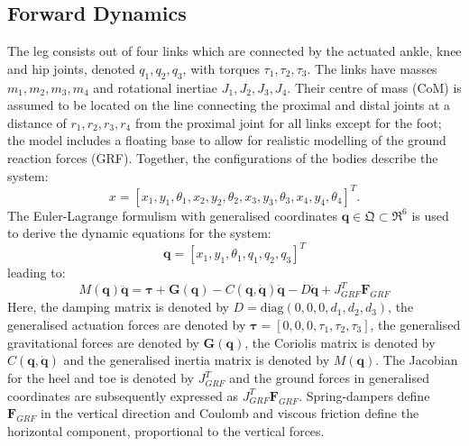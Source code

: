 \documentclass[letterpaper, 10 pt, conference]{ieeeconf}  %
\begin{document}
	\subsection{Forward Dynamics} 
	The leg consists out of four links which are connected by the actuated ankle, knee and hip joints, denoted $q_1,q_2,q_3$, with torques $\tau_1,\tau_2,\tau_3$. %
	The links have masses $m_1,m_2,m_3,m_4$ and rotational inertiae $J_1,J_2,J_3,J_4$. Their centre of mass (CoM) is assumed to be located on the line connecting the proximal and distal joints at a distance of $r_1,r_2,r_3,r_4$ from the proximal joint for all links except for the foot; the model includes a floating base to allow for realistic modelling of the ground reaction forces (GRF). Together, the configurations of the bodies describe the system:
	\begin{equation}
	x = [x_1,y_1,\theta_1,x_2,y_2,\theta_2, x_3,y_3,\theta_3,x_4,y_4,\theta_4]^T. 
	\end{equation}
	The Euler-Lagrange formulism with generalised coordinates $\mathbf{q} \in \mathfrak{Q} \subset \mathfrak{R}^{6}$ is used to derive the dynamic equations for the system:
	\begin{equation}
	\mathbf{q}=[x_1,y_1,\theta_1,q_1,q_2,q_3]^T \label{eq:q}
	\end{equation}
	leading to:
	\begin{equation}
	M(\mathbf{q})\mathbf{\ddot q} = \mathbf{\boldsymbol{\tau} + G(q)} - C\mathbf{(q,\dot q)\dot q -} D \mathbf{\dot q} + J_{GRF}^T \mathbf{F}_{GRF}
	\label{eq:fwddyn}
	\end{equation}
	Here, the damping matrix is denoted by $D = \text{diag} (0,0,0,d_1,d_2,d_3)$, the generalised actuation forces are denoted by $\boldsymbol{\tau} = [0,0,0,\tau_1,\tau_2,\tau_3]$, the generalised gravitational forces are denoted by $\mathbf{G(q)}$, the Coriolis matrix is denoted by $C\mathbf{(q, \dot q)}$ and the generalised inertia matrix is denoted by $M(\mathbf{q})$. The Jacobian for the heel and toe is denoted by $J_{GRF}^T$ and the ground forces in generalised coordinates are subsequently expressed as $J_{GRF}^T \mathbf{F}_{GRF}$. Spring-dampers define $\mathbf{F}_{GRF}$ in the vertical direction and Coulomb and viscous friction define the horizontal component, proportional to the vertical forces.
	
	
\end{document}
